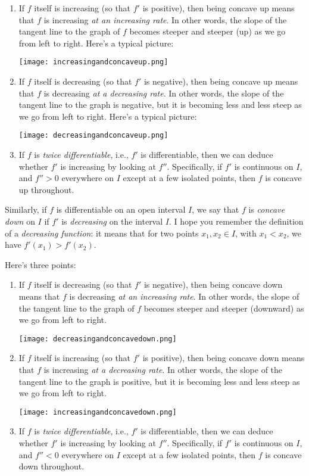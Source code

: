 \documentclass[10pt]{amsart}
\begin{document}
\begin{enumerate}
\item If $f$ itself is increasing (so that $f'$ is positive), then
  being concave up means that $f$ is increasing {\em at an increasing
  rate}. In other words, the slope of the tangent line to the graph of
  $f$ becomes steeper and steeper (up) as we go from left to
  right. Here's a typical picture:

  \texttt{[image: increasingandconcaveup.png]}
\item If $f$ itself is decreasing (so that $f'$ is negative), then
  being concave up means that $f$ is decreasing {\em at a decreasing
  rate}. In other words, the slope of the tangent line to the graph is
  negative, but it is becoming less and less steep as we go from left
  to right. Here's a typical picture:

  \texttt{[image: decreasingandconcaveup.png]}
\item If $f$ is {\em twice differentiable}, i.e., $f'$ is
  differentiable, then we can deduce whether $f'$ is increasing by
  looking at $f''$. Specifically, if $f'$ is continuous on $I$, and
  $f'' > 0$ everywhere on $I$ except at a few isolated points, then
  $f$ is concave up throughout.
\end{enumerate}

Similarly, if $f$ is differentiable on an open interval $I$, we say
that $f$ is {\em concave down} on $I$ if $f'$ is {\em decreasing} on
the interval $I$. I hope you remember the definition
of a {\em decreasing function}: it means that for two points $x_1,
x_2 \in I$, with $x_1 < x_2$, we have $f'(x_1) > f'(x_2)$.

Here's three points:

\begin{enumerate}
\item If $f$ itself is decreasing (so that $f'$ is negative), then
  being concave down means that $f$ is decreasing {\em at an increasing
  rate}. In other words, the slope of the tangent line to the graph of
  $f$ becomes steeper and steeper (downward) as we go from left to right.

  \texttt{[image: decreasingandconcavedown.png]}

\item If $f$ itself is increasing (so that $f'$ is positive), then
  being concave down means that $f$ is increasing {\em at a decreasing
  rate}. In other words, the slope of the tangent line to the graph is
  positive, but it is becoming less and less steep as we go from left
  to right.

  \texttt{[image: increasingandconcavedown.png]}

\item If $f$ is {\em twice differentiable}, i.e., $f'$ is
  differentiable, then we can deduce whether $f'$ is increasing by
  looking at $f''$. Specifically, if $f'$ is continuous on $I$, and
  $f'' < 0$ everywhere on $I$ except at a few isolated points, then
  $f$ is concave down throughout.
\end{enumerate}
\end{document}
